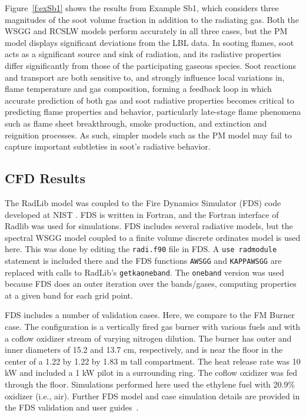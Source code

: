 \documentclass[preprint,12pt]{elsarticle}
\begin{document}
Figure~\ref{f:exSb1} shows the results from Example Sb1, which considers three magnitudes of the soot volume fraction in addition to the radiating gas. Both the WSGG and RCSLW models perform accurately in all three cases, but the PM model displays significant deviations from the LBL data. In sooting flames, soot acts as a significant source and sink of radiation, and its radiative properties differ significantly from those of the participating gaseous species. Soot reactions and transport are both sensitive to, and strongly influence local variations in, flame temperature and gas composition, forming a feedback loop in which accurate prediction of both gas and soot radiative properties becomes critical to predicting flame properties and behavior, particularly late-stage flame phenomena such as flame sheet breakthrough, smoke production, and extinction and reignition processes. As such, simpler models such as the PM model may fail to capture important subtleties in soot's radiative behavior.


\subsection{CFD Results} \label{s:cfd}

The RadLib model was coupled to the Fire Dynamics Simulator (FDS) code developed at NIST \cite{FDS}. FDS is written in Fortran, and the Fortran interface of Radlib was used for simulations. FDS includes several radiative models, but the spectral WSGG model coupled to a finite volume discrete ordinates model is used here. This was done by editing the \texttt{radi.f90} file in FDS. A \texttt{use rad\textunderscore module} statement is included there and the FDS functions \texttt{A\textunderscore WSGG} and \texttt{KAPPA\textunderscore WSGG} are replaced with calls to RadLib's \texttt{get\textunderscore k\textunderscore a\textunderscore oneband}. The \texttt{oneband} version was used because FDS does an outer iteration over the bands/gases, computing properties at a given band for each grid point.

FDS includes a number of validation cases. Here, we compare to the FM Burner case. The configuration is a vertically fired gas burner with various fuels and with a coflow oxidizer stream of varying nitrogen dilution. The burner has outer and inner diameters of 15.2 and 13.7 cm, respectively, and is near the floor in the center of a 1.22 by 1.22 by 1.83 m tall compartment. The heat release rate was 10 kW and included a 1 kW pilot in a surrounding ring. The coflow oxidizer was fed through the floor. Simulations performed here used the ethylene fuel with 20.9\%  oxidizer (i.e., air). Further FDS model and case simulation details are provided in the FDS validation and user guides~\cite{FDS}.
\end{document}
